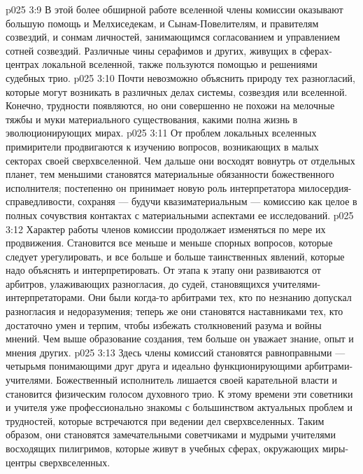\vs p025 3:9 \bibnobreakspace {} В этой более обширной работе вселенной члены комиссии оказывают большую помощь и Мелхиседекам, и Сынам\hyp{}Повелителям, и правителям созвездий, и сонмам личностей, занимающимся согласованием и управлением сотней созвездий. Различные чины серафимов и других, живущих в сферах\hyp{}центрах локальной вселенной, также пользуются помощью и решениями судебных трио.
\vs p025 3:10 Почти невозможно объяснить природу тех разногласий, которые могут возникать в различных делах системы, созвездия или вселенной. Конечно, трудности появляются, но они совершенно не похожи на мелочные тяжбы и муки материального существования, какими полна жизнь в эволюционирующих мирах.
\vs p025 3:11 \bibnobreakspace {} От проблем локальных вселенных примирители продвигаются к изучению вопросов, возникающих в малых секторах своей сверхвселенной. Чем дальше они восходят вовнутрь от отдельных планет, тем меньшими становятся материальные обязанности божественного исполнителя; постепенно он принимает новую роль интерпретатора милосердия\hyp{}справедливости, сохраняя --- будучи квазиматериальным --- комиссию как целое в полных сочувствия контактах с материальными аспектами ее исследований.
\vs p025 3:12 \bibnobreakspace {} Характер работы членов комиссии продолжает изменяться по мере их продвижения. Становится все меньше и меньше спорных вопросов, которые следует урегулировать, и все больше и больше таинственных явлений, которые надо объяснять и интерпретировать. От этапа к этапу они развиваются от арбитров, улаживающих разногласия, до  судей, становящихся учителями\hyp{}интерпретаторами. Они были когда\hyp{}то арбитрами тех, кто по незнанию допускал разногласия и недоразумения; теперь же они становятся наставниками тех, кто достаточно умен и терпим, чтобы избежать столкновений разума и войны мнений. Чем выше образование создания, тем больше он уважает знание, опыт и мнения других.
\vs p025 3:13 \bibnobreakspace {} Здесь члены комиссий становятся равноправными --- четырьмя понимающими друг друга и идеально функционирующими арбитрами\hyp{}учителями. Божественный исполнитель лишается своей карательной власти и становится физическим голосом духовного трио. К этому времени эти советники и учителя уже профессионально знакомы с большинством актуальных проблем и трудностей, которые встречаются при ведении дел сверхвселенных. Таким образом, они становятся замечательными советчиками и мудрыми учителями восходящих пилигримов, которые живут в учебных сферах, окружающих миры\hyp{}центры сверхвселенных.
